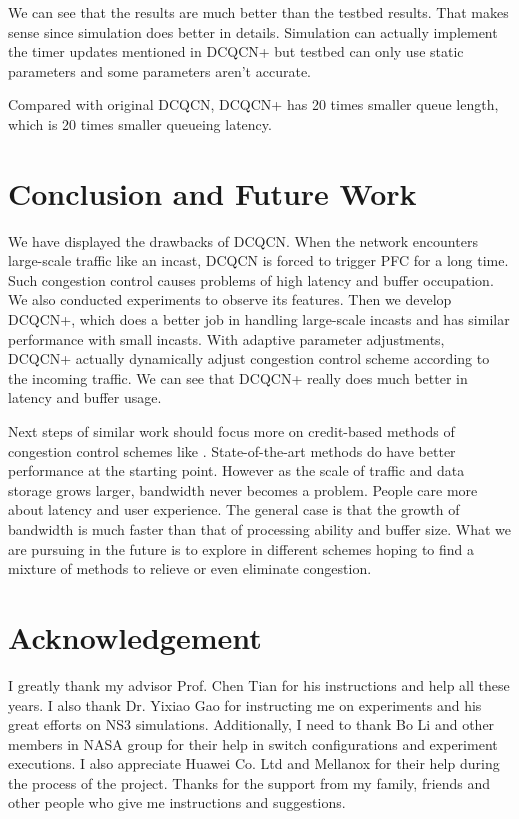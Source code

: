 \documentclass[12pt,a4paper]{article}
\begin{document}
We can see that the results are much better than the testbed results.
That makes sense since simulation does better in details.
Simulation can actually implement the timer updates mentioned in DCQCN+ but testbed can only use static parameters and some parameters
aren't accurate.

Compared with original DCQCN, DCQCN+ has 20 times smaller queue length, which is 20 times smaller queueing latency.


\section{Conclusion and Future Work}

We have displayed the drawbacks of DCQCN.
When the network encounters large-scale traffic like an incast, DCQCN is forced to trigger PFC for a long time.
Such congestion control causes problems of high latency and buffer occupation.
We also conducted experiments to observe its features.
Then we develop DCQCN+, which does a better job in handling large-scale incasts and has similar performance with small incasts.
With adaptive parameter adjustments, DCQCN+ actually dynamically adjust congestion control scheme according to the incoming traffic.
We can see that DCQCN+ really does much better in latency and buffer usage.

Next steps of similar work should focus more on credit-based methods of congestion control schemes like \cite{credit}.
State-of-the-art methods do have better performance at the starting point.
However as the scale of traffic and data storage grows larger, bandwidth never becomes a problem.
People care more about latency and user experience.
The general case is that the growth of bandwidth is much faster than that of processing ability and buffer size.
What we are pursuing in the future is to explore in different schemes hoping to find a mixture of methods to relieve or even eliminate congestion.

\section*{Acknowledgement}

I greatly thank my advisor Prof. Chen Tian for his instructions and help all these years.
I also thank Dr. Yixiao Gao for instructing me on experiments and his great efforts on NS3 simulations.
Additionally, I need to thank Bo Li and other members in NASA group for their help in switch configurations and experiment executions.
I also appreciate Huawei Co. Ltd and Mellanox for their help during the process of the project.
Thanks for the support from my family, friends and other people who give me instructions and suggestions.
\end{document}

